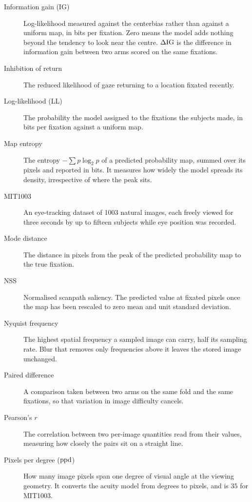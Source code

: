 \begin{description}
\item[Information gain (IG)] Log-likelihood measured against the centerbias rather
  than against a uniform map, in bits per fixation. Zero means the model adds nothing beyond the tendency
  to look near the centre. $\Delta \mathrm{IG}$ is the difference in information gain between two arms scored on
  the same fixations.

\item[Inhibition of return] The reduced likelihood of gaze returning to a location fixated recently.

\item[Log-likelihood (LL)] The probability the model assigned to the fixations the subjects made, in
  bits per fixation against a uniform map.

\item[Map entropy] The entropy $-\sum p \log_2 p$ of a predicted probability map, summed over its pixels
  and reported in bits. It measures how widely the model spreads its density, irrespective of where the
  peak sits.

\item[MIT1003] An eye-tracking dataset of 1003 natural images, each freely viewed for three seconds
  by up to fifteen subjects while eye position was recorded.

\item[Mode distance] The distance in pixels from the peak of the predicted probability map to the true
  fixation.

\item[NSS] Normalised scanpath saliency. The predicted value at fixated pixels once the map has been
  rescaled to zero mean and unit standard deviation.

\item[Nyquist frequency] The highest spatial frequency a sampled image can carry, half its sampling
  rate. Blur that removes only frequencies above it leaves the stored image unchanged.

\item[Paired difference] A comparison taken between two arms on the same fold and the same fixations, so
  that variation in image difficulty cancels.

\item[Pearson's $r$] The correlation between two per-image quantities read from their values, measuring
  how closely the pairs sit on a straight line.

\item[Pixels per degree ($\mathrm{ppd}$)] How many image pixels span one degree of visual angle at the viewing
  geometry. It converts the acuity model from degrees to pixels, and is $35$ for MIT1003.


\end{description}
